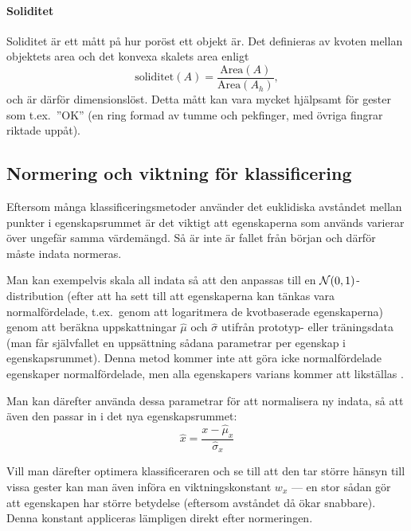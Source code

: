 \documentclass[../rapport_MVEX01-11-05]{subfiles}
\begin{document}
\paragraph{Soliditet}

Soliditet är ett mått på hur poröst ett objekt är. Det
definieras av kvoten mellan objektets area och det konvexa skalets
area enligt
\begin{equation*}
  \textrm{soliditet}(A) = \frac{\textrm{Area}(A)}{\textrm{Area}(A_h)},
\end{equation*}
och är därför dimensionslöst. Detta mått kan vara mycket hjälpsamt för
gester som t.ex.~''OK'' (en ring formad av tumme och pekfinger, med
övriga fingrar riktade uppåt).

\subsection{Normering och viktning för klassificering}\label{sec:normering}
Eftersom många klassificeringsmetoder använder det euklidiska avståndet mellan punkter i 
egenskapsrummet är det viktigt att egenskaperna som används varierar över
ungefär samma värdemängd. Så är inte är fallet från början och därför måste indata
normeras.

Man kan exempelvis skala all indata så att den anpassas till en 
$\mathcal{N}(0,1)$-distribution (efter att ha sett till att egenskaperna kan tänkas 
vara normalfördelade, t.ex.~genom att logaritmera de kvotbaserade 
egenskaperna) genom att beräkna uppskattningar $\hat\mu$ och $\hat\sigma$
utifrån prototyp- eller träningsdata (man får självfallet en uppsättning sådana
parametrar per egenskap i egenskapsrummet). Denna metod kommer inte
att göra icke normalfördelade egenskaper normalfördelade, men alla
egenskapers varians kommer att likställas \cite{Aksoy01}.

Man kan därefter använda dessa parametrar för att normalisera ny indata, så
att även den passar in i det nya egenskapsrummet:
\begin{equation*}
	\hat{x} = \frac{x - \hat\mu_x}{\hat\sigma_x}
\end{equation*}

Vill man därefter optimera klassificeraren och se till att den tar större hänsyn
till vissa gester kan man även införa en viktningskonstant $w_x$ --- en stor
sådan gör att egenskapen har större betydelse (eftersom avståndet då ökar
snabbare). Denna konstant appliceras lämpligen direkt efter normeringen.
\end{document}

